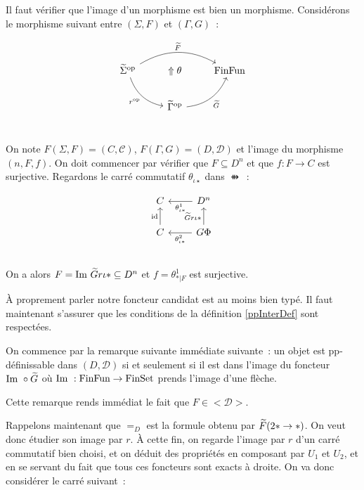 \begin{pv}
    Il faut vérifier que l'image d'un morphisme est bien un morphisme. Considérons le
    morphisme suivant entre $(\Sigma,F)$ et $(\Gamma,G)$~:

    \[\begin{tikzcd}
        \tsigma^\op\arrow[dr, bend right, swap, "r^\op"]\arrow[rr, bend left, "\tf"]
            & \Uparrow\theta
            & \ffun \\
        & \tgamma^\op\arrow[ur, bend right, swap, "\tg"] \\
    \end{tikzcd}\]

    On note $F(\Sigma,F) = (C,\mathcal{C})$, $F(\Gamma,G) = (D,\mathcal{D})$ et l'image
    du morphisme $(n, F, f)$. On doit commencer par vérifier que $F\subseteq D^n$ et
    que $f : F\rightarrow C$ est surjective. Regardons le carré commutatif
    $\theta_{\iota\star}$ dans $\ffun$~:

    \[\begin{tikzcd}
        C & D^n\arrow[l, "\theta^1_{\iota\ast}"] \\
        C\arrow[u, "\id"]
            & G\Phi\arrow[u, "\tg r\iota\ast"]\arrow[l, "\theta^2_{\iota\ast}"] \\
    \end{tikzcd}\]

    On a alors $F = \text{Im }\widetilde{G} r\iota\ast\subseteq D^n$ et $f = \theta^1_{\ast|F}$ est
    surjective.

    À proprement parler notre foncteur candidat est au moins bien typé. Il faut
    maintenant s'assurer que les conditions de la définition \ref{ppInterDef}
    sont respectées.

    On commence par la remarque suivante immédiate suivante~: un objet est
    pp-définissable dans $(D,\mathcal{D})$ si et seulement si il est dans
    l'image du foncteur $\text{Im }\circ\widetilde{G}$ où $\text{Im }:\text{FinFun}\rightarrow\text{FinSet}$ prends
    l'image d'une flèche.

    Cette remarque rends immédiat le fait que $F\in<\mathcal{D}>$.

    Rappelons maintenant que $=_D$ est la formule obtenu par $\widetilde{F}(2\ast\rightarrow\ast)$.
    On veut donc étudier son image par $r$. À cette fin, on regarde l'image par
    $r$ d'un carré commutatif bien choisi, et on déduit des propriétés en composant par
    $U_1$ et $U_2$, et en se servant du fait que tous ces foncteurs sont exacts à droite.
    On va donc considérer le carré suivant~:


\end{pv}
